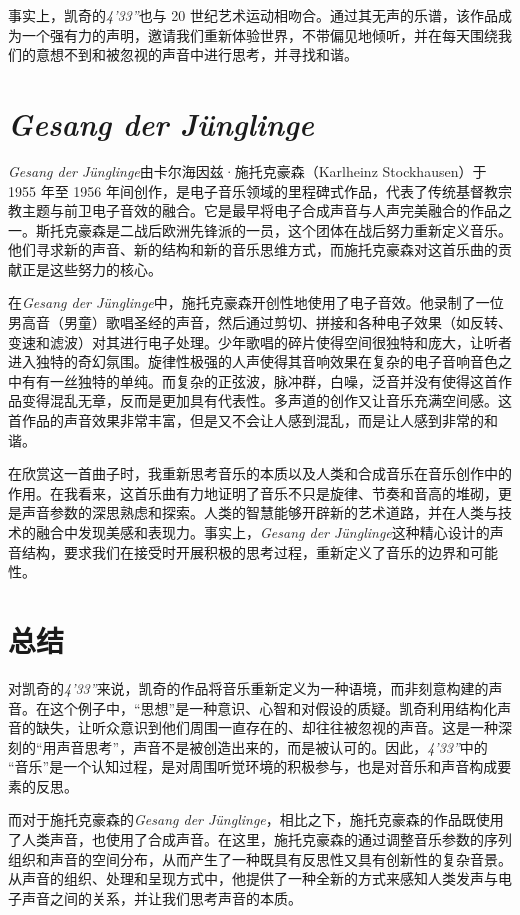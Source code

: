 \documentclass{article}
\begin{document}
事实上，凯奇的\emph{4'33''}也与 20 世纪艺术运动相吻合。通过其无声的乐谱，该作品成为一个强有力的声明，邀请我们重新体验世界，不带偏见地倾听，并在每天围绕我们的意想不到和被忽视的声音中进行思考，并寻找和谐。

\section{\emph{Gesang der Jünglinge}}

\emph{Gesang der Jünglinge}由卡尔海因兹·施托克豪森（Karlheinz Stockhausen）于 1955 年至 1956 年间创作，是电子音乐领域的里程碑式作品，代表了传统基督教宗教主题与前卫电子音效的融合。它是最早将电子合成声音与人声完美融合的作品之一。斯托克豪森是二战后欧洲先锋派的一员，这个团体在战后努力重新定义音乐。他们寻求新的声音、新的结构和新的音乐思维方式，而施托克豪森对这首乐曲的贡献正是这些努力的核心。\cite{Gesang}

在\emph{Gesang der Jünglinge}中，施托克豪森开创性地使用了电子音效。他录制了一位男高音（男童）歌唱圣经的声音，然后通过剪切、拼接和各种电子效果（如反转、变速和滤波）对其进行电子处理。少年歌唱的碎片使得空间很独特和庞大，让听者进入独特的奇幻氛围。旋律性极强的人声使得其音响效果在复杂的电子音响音色之中有有一丝独特的单纯。而复杂的正弦波，脉冲群，白噪，泛音并没有使得这首作品变得混乱无章，反而是更加具有代表性。多声道的创作又让音乐充满空间感。这首作品的声音效果非常丰富，但是又不会让人感到混乱，而是让人感到非常的和谐。

在欣赏这一首曲子时，我重新思考音乐的本质以及人类和合成音乐在音乐创作中的作用。在我看来，这首乐曲有力地证明了音乐不只是旋律、节奏和音高的堆砌，更是声音参数的深思熟虑和探索。人类的智慧能够开辟新的艺术道路，并在人类与技术的融合中发现美感和表现力。事实上，\emph{Gesang der Jünglinge}这种精心设计的声音结构，要求我们在接受时开展积极的思考过程，重新定义了音乐的边界和可能性。

\section{总结}

对凯奇的\emph{4'33''}来说，凯奇的作品将音乐重新定义为一种语境，而非刻意构建的声音。在这个例子中，“思想”是一种意识、心智和对假设的质疑。凯奇利用结构化声音的缺失，让听众意识到他们周围一直存在的、却往往被忽视的声音。这是一种深刻的“用声音思考”，声音不是被创造出来的，而是被认可的。因此，\emph{4'33''}中的 “音乐”是一个认知过程，是对周围听觉环境的积极参与，也是对音乐和声音构成要素的反思。

而对于施托克豪森的\emph{Gesang der Jünglinge}，相比之下，施托克豪森的作品既使用了人类声音，也使用了合成声音。在这里，施托克豪森的通过调整音乐参数的序列组织和声音的空间分布，从而产生了一种既具有反思性又具有创新性的复杂音景。从声音的组织、处理和呈现方式中，他提供了一种全新的方式来感知人类发声与电子声音之间的关系，并让我们思考声音的本质。
\end{document}
